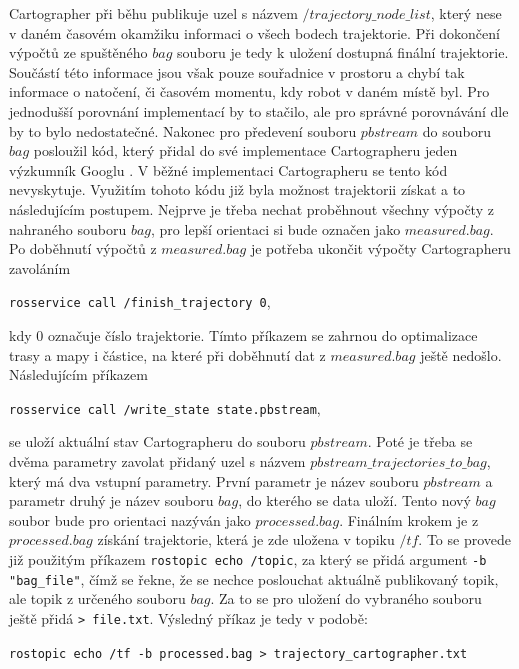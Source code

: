 \documentclass[12pt]{report}
\begin{document}
Cartographer při běhu publikuje uzel s názvem $/trajectory\_node\_list$, který nese v daném časovém okamžiku informaci o všech bodech trajektorie. Při dokončení výpočtů ze spuštěného $bag$ souboru je tedy k uložení dostupná finální trajektorie. Součástí této informace jsou však pouze souřadnice v prostoru a chybí tak informace o natočení, či časovém momentu, kdy robot v daném místě byl. Pro jednodušší porovnání implementací by to stačilo, ale pro správné porovnávání dle \cite{Kuemmerle2009} by to bylo nedostatečné. Nakonec pro předevení souboru $pbstream$ do souboru $bag$ posloužil kód, který přidal do své implementace Cartographeru jeden výzkumník Googlu \cite{Lee2019}. V běžné implementaci Cartographeru se tento kód nevyskytuje. Využitím tohoto kódu již byla možnost trajektorii získat a to následujícím postupem. Nejprve je třeba nechat proběhnout všechny výpočty z nahraného souboru $bag$, pro lepší orientaci si bude označen jako $measured.bag$. Po doběhnutí výpočtů z $measured.bag$ je potřeba ukončit výpočty Cartographeru zavoláním
\begin{center}
	\texttt{rosservice call /finish\_trajectory 0},
\end{center}
kdy $0$ označuje číslo trajektorie. Tímto příkazem se zahrnou do optimalizace trasy a mapy i částice, na které při doběhnutí dat z $measured.bag$ ještě nedošlo. Následujícím příkazem
\begin{center}
	\texttt{rosservice call /write\_state state.pbstream},
\end{center} 
se uloží aktuální stav Cartographeru do souboru $pbstream$. Poté je třeba se dvěma parametry zavolat přidaný uzel s názvem $pbstream\_trajectories\_to\_bag$, který má dva vstupní parametry. První parametr je název souboru $pbstream$ a parametr druhý je název souboru $bag$, do kterého se data uloží. Tento nový $bag$ soubor bude pro orientaci nazýván jako $processed.bag$. Finálním krokem je z $processed.bag$ získání trajektorie, která je zde uložena v topiku $/tf$. To se provede již použitým příkazem \texttt{rostopic echo /topic}, za který se přidá argument \texttt{-b "bag\_file"}, čímž se řekne, že se nechce poslouchat aktuálně publikovaný topik, ale topik z určeného souboru $bag$. Za to se pro uložení do vybraného souboru ještě přidá \texttt{> file.txt}. Výsledný příkaz je tedy v podobě:
\begin{center}
	\texttt{rostopic echo /tf -b processed.bag > trajectory\_cartographer.txt}
\end{center}
\end{document}
